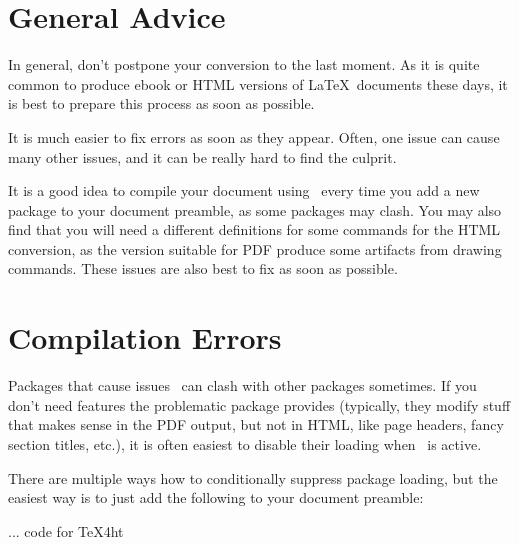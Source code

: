 
\section{General Advice}

In general, don't postpone your conversion to the last moment. As it is quite
common to produce ebook or HTML versions of \LaTeX\ documents these days, it is 
best to prepare this process as soon as possible.

It is much easier to fix errors as soon as they appear. Often, one issue can
cause many other issues, and it can be really hard to find the culprit. 

It is a good idea to compile your document using \texfourht\ every time you add
a new package to your document preamble, as some packages may clash. You may also find
that you will need a different definitions for some commands for the HTML conversion, as the 
version suitable for PDF produce some artifacts from drawing commands. These issues are 
also best to fix as soon as possible.

\section{Compilation Errors}
\label{faq:compilation_errors}


\begin{issue}{Packages that cause issues}
\texfourht\ can clash with other packages sometimes. If you don't need features
the problematic package provides (typically, they modify stuff that makes sense in 
the PDF output, but not in HTML, like page headers, fancy section titles, etc.),
it is often easiest to disable their loading when \texfourht\ is active. 

There are multiple ways how to conditionally suppress package loading, but the easiest 
way is to just add the following to your document preamble:

\begin{texsource}
\ifdefined\HCode
... code for TeX4ht
\else
\usepackage{foo}
\fi
\end{texsource}
\end{issue}

